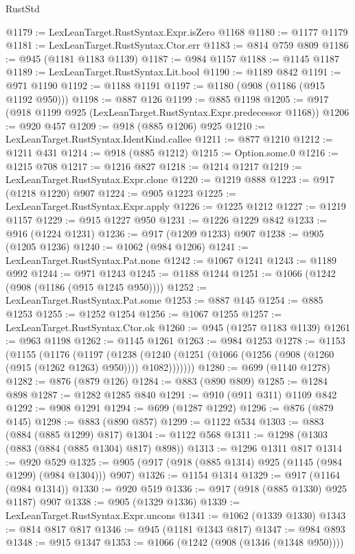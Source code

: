 \begin{lexlean}{RustStd}
\begin{coremodule}
@1179 := LexLeanTarget.RustSyntax.Expr.isZero @1168
@1180 := @1177 @1179
@1181 := LexLeanTarget.RustSyntax.Ctor.err
@1183 := @814 @759 @809
@1186 := @945 (@1181 @1183 @1139)
@1187 := @984 @1157
@1188 := @1145 @1187
@1189 := LexLeanTarget.RustSyntax.Lit.bool
@1190 := @1189 @842
@1191 := @971 @1190
@1192 := @1188 @1191
@1197 := @1180 (@908 (@1186 (@915 @1192 @950)))
@1198 := @887 @126
@1199 := @885 @1198
@1205 := @917 (@918 @1199 @925 (LexLeanTarget.RustSyntax.Expr.predecessor @1168))
@1206 := @920 @457
@1209 := @918 (@885 @1206) @925
@1210 := LexLeanTarget.RustSyntax.IdentKind.callee
@1211 := @877 @1210
@1212 := @1211 @431
@1214 := @918 (@885 @1212)
@1215 := Option.some.{0}
@1216 := @1215 @708
@1217 := @1216 @827
@1218 := @1214 @1217
@1219 := LexLeanTarget.RustSyntax.Expr.clone
@1220 := @1219 @888
@1223 := @917 (@1218 @1220) @907
@1224 := @905 @1223
@1225 := LexLeanTarget.RustSyntax.Expr.apply
@1226 := @1225 @1212
@1227 := @1219 @1157
@1229 := @915 @1227 @950
@1231 := @1226 @1229 @842
@1233 := @916 (@1224 @1231)
@1236 := @917 (@1209 @1233) @907
@1238 := @905 (@1205 @1236)
@1240 := @1062 (@984 @1206)
@1241 := LexLeanTarget.RustSyntax.Pat.none
@1242 := @1067 @1241
@1243 := @1189 @992
@1244 := @971 @1243
@1245 := @1188 @1244
@1251 := @1066 (@1242 (@908 (@1186 (@915 @1245 @950))))
@1252 := LexLeanTarget.RustSyntax.Pat.some
@1253 := @887 @145
@1254 := @885 @1253
@1255 := @1252 @1254
@1256 := @1067 @1255
@1257 := LexLeanTarget.RustSyntax.Ctor.ok
@1260 := @945 (@1257 @1183 @1139)
@1261 := @963 @1198
@1262 := @1145 @1261
@1263 := @984 @1253
@1278 := @1153
    (@1155
      (@1176
        (@1197
          (@1238 (@1240 (@1251 (@1066 (@1256 (@908 (@1260 (@915 (@1262 @1263) @950)))) @1082)))))))
@1280 := @699 (@1140 @1278)
@1282 := @876 (@879 @126)
@1284 := @883 (@890 @809)
@1285 := @1284 @898
@1287 := @1282 @1285 @840
@1291 := @910 (@911 @311) @1109 @842
@1292 := @908 @1291
@1294 := @699 (@1287 @1292)
@1296 := @876 (@879 @145)
@1298 := @883 (@890 @857)
@1299 := @1122 @534
@1303 := @883 (@884 (@885 @1299) @817)
@1304 := @1122 @568
@1311 := @1298 (@1303 (@883 (@884 (@885 @1304) @817) @898))
@1313 := @1296 @1311 @817
@1314 := @920 @529
@1325 := @905 (@917 (@918 (@885 @1314) @925 (@1145 (@984 @1299) (@984 @1304))) @907)
@1326 := @1154 @1314
@1329 := @917 (@1164 (@984 @1314))
@1330 := @920 @519
@1336 := @917 (@918 (@885 @1330) @925 @1187) @907
@1338 := @905 (@1329 @1336)
@1339 := LexLeanTarget.RustSyntax.Expr.uncons
@1341 := @1062 (@1339 @1330)
@1343 := @814 @817 @817
@1346 := @945 (@1181 @1343 @817)
@1347 := @984 @893
@1348 := @915 @1347
@1353 := @1066 (@1242 (@908 (@1346 (@1348 @950))))

\end{coremodule}
\end{lexlean}
